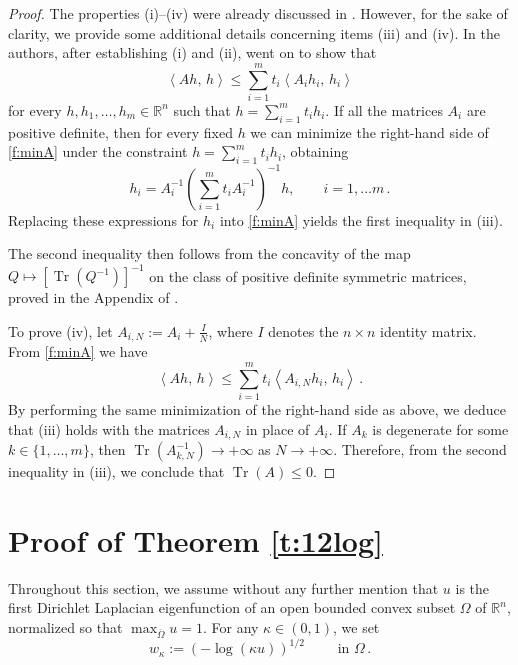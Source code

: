 \documentclass[11pt]{amsart}
\theoremstyle{definition}
\theoremstyle{remark}
\def\R{\mathbb{R}}
\def\pscal#1#2{\left\langle#1,\,#2\right\rangle}
\def\Om{\Omega}
\def\k{\kappa}
\DeclareMathOperator{\Tr}{Tr}
\begin{document}
\begin{proof}
The properties (i)--(iv) were already discussed  in \cite[p.~272]{ALL}. 
However,  for the sake of clarity, we provide some additional details concerning items (iii) and (iv).
In \cite{ALL} the authors, after establishing (i) and (ii), went on to show that
\begin{equation}
\label{f:minA}
\pscal{Ah}{h} \leq
\sum_{i=1}^m t_i \pscal{A_i h_i}{h_i}
\end{equation}
for every $h, h_1, \ldots, h_m\in \R^n$ such that
$h = \sum_{i=1}^m t_i h_i$.
If all the  matrices $A_i$ are positive definite,  then for every fixed $h$
we can minimize the right-hand side of \eqref{f:minA}
under the constraint $h = \sum_{i=1}^m t_i h_i$,
obtaining  \[
h_i = A_i^{-1} \left(\sum_{i=1}^m t_i A_i^{-1}\right)^{-1}\!\!\! \!\! h ,
\qquad i = 1, \ldots m\,.
\]
Replacing these expressions for  $h _i$ into \eqref{f:minA} yields
the first inequality in (iii).

The second inequality then follows from the concavity
of the map $Q \mapsto [\Tr(Q^{-1})]^{-1}$ on the class of
positive definite symmetric matrices, proved in the Appendix of \cite{ALL}. 

To prove (iv), let $A_{i,N} := A_i +\frac { I }{  N}$, where $I$ denotes the $n\times n$ identity matrix. 
From \eqref{f:minA} we have 
\[
\pscal{Ah}{h} \leq
\sum_{i=1}^m t_i \pscal{A_{i,N} h_i}{h_i}\,.
\]
By performing the same minimization of the right-hand side as above,
we deduce that (iii) holds with the matrices $A_{i,N}$ in place of $A_i$.
If $A_k$ is degenerate for some $k\in \{1,\ldots,m\}$,
then $\Tr(A_{k,N}^{-1}) \to +\infty$ as $N\to +\infty$. Therefore, 
from the second inequality in (iii), we conclude that
$\Tr(A) \leq 0$. 
\end{proof}










\bigskip\bigskip
\section{Proof of Theorem \ref{t:12log}} \label{sec:proof1}  




Throughout this section, we assume without any further mention that 
$u$ is the first Dirichlet Laplacian eigenfunction of  an open bounded convex subset $\Om$ of $\R^n$, 
normalized so that $\max_{\overline \Om } u  = 1$. For any $\k \in (0, 1)$, 
we set 
\begin{equation}\label{f:norm} 
w  _\k:= (- \log (\k u) ) ^ { 1/2} \qquad \text{ in } \Om\,. 
\end{equation}   
\end{document}
